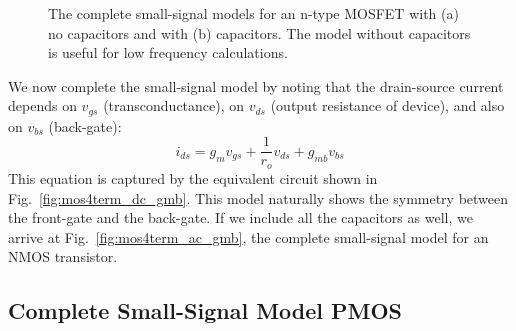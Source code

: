 \begin{figure}[tb]
\begin{center}
\end{center}
\caption{The complete small-signal models for an n-type MOSFET with (a) no capacitors and with (b) capacitors.  The model without capacitors is useful for low frequency calculations.} 
\end{figure}


We now complete the small-signal model by noting that the drain-source current depends on $v_{gs}$ (transconductance), on $v_{ds}$ (output resistance of device), and also on $v_{bs}$ (back-gate):
%
\begin{equation}
	{i_{ds}} = {g_m}{v_{gs}} +  \frac{1}{{{r_o}}}{v_{ds}} + {g_{mb}}{v_{bs}} 
\end{equation}
%
This equation is captured by the equivalent circuit shown in Fig.~\ref{fig:mos4term_dc_gmb}.  This model naturally shows the symmetry between the front-gate and the back-gate.   If we include all the capacitors as well, we arrive at Fig.~\ref{fig:mos4term_ac_gmb}, the complete small-signal model for an NMOS transistor.


\subsection{Complete Small-Signal Model PMOS}

